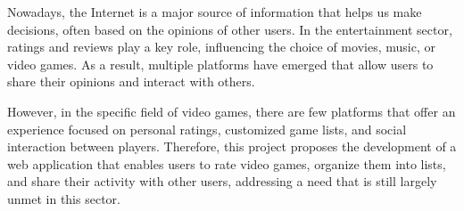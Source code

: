 
Nowadays, the Internet is a major source of information that helps us make decisions, often based on the opinions of other users. 
In the entertainment sector, ratings and reviews play a key role, influencing the choice of movies, music, or video games. 
As a result, multiple platforms have emerged that allow users to share their opinions and interact with others.

However, in the specific field of video games, there are few platforms that offer an experience focused on personal ratings, 
customized game lists, and social interaction between players. Therefore, this project proposes the development of a web application 
that enables users to rate video games, organize them into lists, and share their activity with other users, addressing a need that is still largely unmet in this sector.

